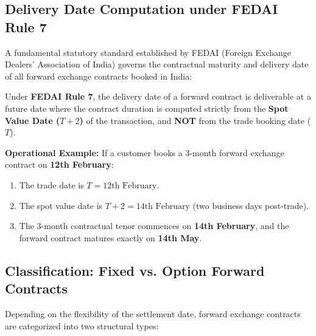 \subsection{Delivery Date Computation under FEDAI Rule 7}
A fundamental statutory standard established by FEDAI (Foreign Exchange Dealers' Association of India) governs the contractual maturity and delivery date of all forward exchange contracts booked in India:

\begin{center}
\begin{minipage}{0.92\linewidth}
\begin{remarkbox}
Under \textbf{FEDAI Rule 7}, the delivery date of a forward contract is deliverable at a future date where the contract duration is computed strictly from the \textbf{Spot Value Date ($T+2$)} of the transaction, and \textbf{NOT} from the trade booking date ($T$).
\end{remarkbox}
\end{minipage}
\end{center}

\noindent\textbf{Operational Example:}
If a customer books a 3-month forward exchange contract on \textbf{12th February}:
\begin{enumerate}[leftmargin=*]
    \item The trade date is $T = \text{12th February}$.
    \item The spot value date is $T+2 = \text{14th February}$ (two business days post-trade).
    \item The 3-month contractual tenor commences on \textbf{14th February}, and the forward contract matures exactly on \textbf{14th May}.
\end{enumerate}

\subsection{Classification: Fixed vs. Option Forward Contracts}
Depending on the flexibility of the settlement date, forward exchange contracts are categorized into two structural types:

